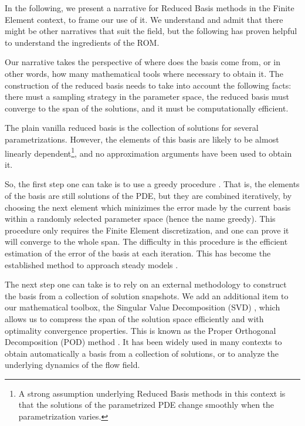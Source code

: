 \documentclass[thesis.tex]{subfiles}
\begin{document}
In the following,
we present a narrative for Reduced Basis methods in the Finite Element context,
to frame our use of it.
We understand and admit that there might be other narratives that suit the field,
but the following has proven helpful to understand the ingredients of the ROM.

Our narrative takes the perspective of where does the basis come from,
or in other words,
how many mathematical tools where necessary to obtain it.
The construction of the reduced basis needs to take into account the following facts:
there must a sampling strategy in the parameter space,
the reduced basis must converge to the span of the solutions,
and it must be computationally efficient.

The plain vanilla reduced basis is the collection of solutions
for several parametrizations.
However, the elements of this basis are likely to be almost linearly dependent\footnote{
    A strong assumption underlying Reduced Basis methods in this context
    is that the solutions of the parametrized PDE
    change smoothly when the parametrization varies.
},
and no approximation arguments have been used to obtain it.

So, the first step one can take is to use a greedy procedure
\cite{Buffa2012APC, Veroy2003}.
That is, the elements of the basis are still solutions of the PDE, 
but they are combined iteratively,
by choosing the next element which minizimes 
the error made by the current basis within a randomly selected parameter space
(hence the name greedy).
This procedure only requires the Finite Element discretization,
and one can prove it will converge to the whole span.
The difficulty in this procedure 
is the efficient estimation of the error
of the basis at each iteration.
This has become the established method to approach steady models \cite{Haasdonk2013}.

The next step one can take is to rely on an external methodology
to construct the basis from a collection of solution snapshots.
We add an additional item to our mathematical toolbox,
the Singular Value Decomposition (SVD)
\cite{2000_POD_as_SVD},
which allows us to compress the span of the solution space
efficiently and with optimality convergence properties.
This is known as the Proper Orthogonal Decomposition (POD) method
\cite{1987_turbulenceDynamicsCoherentStructures_Sirovich,
Aubry1991}.
It has been widely used in many contexts 
to obtain automatically a basis from a collection of solutions,
or to analyze the underlying dynamics of the flow field.
\end{document}
